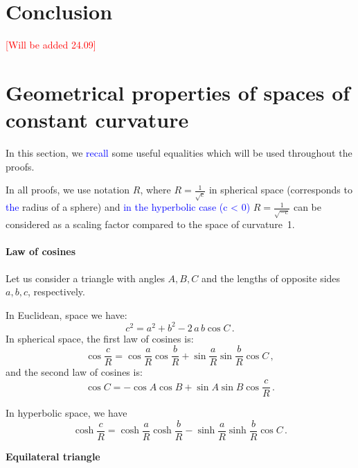 \documentclass{article} %
\newcommand{\ph}[1]{\textcolor{blue}{#1}}
\begin{document}
\section{Conclusion}

\textcolor{red}{[Will be added 24.09]}






\appendix

\section{Geometrical properties of spaces of constant curvature}

In this section, we \ph{recall} some useful equalities which will be used throughout the proofs.

In all proofs, we use notation $R$, where $R = \frac{1}{\sqrt{c}}$ in spherical space (corresponds to \ph{the} radius of a sphere) and \ph{in the hyperbolic case (c < 0)} $R = \frac{1}{\sqrt{-c}}$ can be considered as a scaling factor compared to the space of curvature~1.

\paragraph{Law of cosines}

Let us consider a triangle with angles $A, B, C$ and the lengths of opposite sides $a, b, c$, respectively.

In Euclidean, space we have:
\[
c^2 = a^2 + b^2 - 2 \, a\, b \cos C\,.
\]
In spherical space, the first law of cosines is:
\[
\cos \frac{c}{R} =\cos \frac{a}{R} \cos \frac{b}{R} + \sin \frac{a}{R}\sin \frac{b}{R}\cos C \,,
\]
and the second law of cosines is:
\[
\cos C=-\cos A\cos B+\sin A\sin B\cos \frac{c}{R}\,.
\]

In hyperbolic space, we have 
\[
\cosh {\frac {c}{R}}= \cosh {\frac {a}{R}}\cosh {\frac {b}{R}}-\sinh {\frac {a}{R}}\sinh {\frac {b}{R}}\cos C \,.
\]

\textbf{Equilateral triangle}
\end{document}
